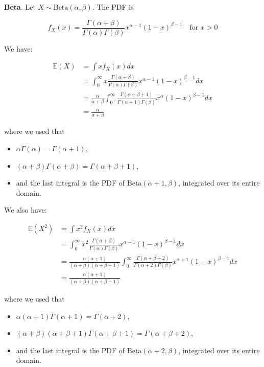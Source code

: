 \textbf{Beta}. Let \(X \sim \text{Beta}(\alpha, \beta)\). The PDF is

\[f_X(x) = \frac{\Gamma(\alpha + \beta)}{\Gamma(\alpha) \Gamma(\beta)} x^{\alpha - 1}(1 - x)^{\beta - 1} \quad \text{for } x > 0\]

We have:

\begin{align*}
\mathbb{E}(X) 
&= \int x f_X(x) dx \\
&= \int_{0}^{\infty} x \frac{\Gamma(\alpha + \beta)}{\Gamma(\alpha) \Gamma(\beta)} x^{\alpha - 1}(1 - x)^{\beta - 1} dx \\
&= \frac{\alpha}{\alpha + \beta} \int_{0}^{\infty} \frac{\Gamma(\alpha + \beta + 1)}{\Gamma(\alpha + 1) \Gamma(\beta)} x^{\alpha}(1 - x)^{\beta - 1} dx \\
&= \frac{\alpha}{\alpha + \beta}
\end{align*}

where we used that

\begin{itemize}[tightlist]
\item
  \(\alpha \Gamma(\alpha) = \Gamma(\alpha + 1)\),
\item
  \((\alpha + \beta) \Gamma(\alpha + \beta) = \Gamma(\alpha + \beta + 1)\),
\item
  and the last integral is the PDF of
  \(\text{Beta}(\alpha + 1, \beta)\), integrated over its entire domain.
\end{itemize}

We also have:

\begin{align*}
\mathbb{E}(X^{2}) 
&= \int x^{2} f_X(x) dx \\
&= \int_{0}^{\infty} x^{2} \frac{\Gamma(\alpha + \beta)}{\Gamma(\alpha) \Gamma(\beta)} x^{\alpha - 1}(1 - x)^{\beta - 1} dx \\
&= \frac{\alpha (\alpha + 1)}{(\alpha + \beta)(\alpha + \beta + 1)} \int_{0}^{\infty} \frac{\Gamma(\alpha + \beta + 2)}{\Gamma(\alpha + 2) \Gamma(\beta)} x^{\alpha + 1}(1 - x)^{\beta - 1} dx \\
&= \frac{\alpha (\alpha + 1)}{(\alpha + \beta)(\alpha + \beta + 1)}
\end{align*}

where we used that

\begin{itemize}[tightlist]
\item
  \(\alpha (\alpha + 1) \Gamma(\alpha + 1) = \Gamma(\alpha + 2)\),
\item
  \((\alpha + \beta) (\alpha + \beta + 1) \Gamma(\alpha + \beta + 1) = \Gamma(\alpha + \beta + 2)\),
\item
  and the last integral is the PDF of
  \(\text{Beta}(\alpha + 2, \beta)\), integrated over its entire domain.
\end{itemize}

